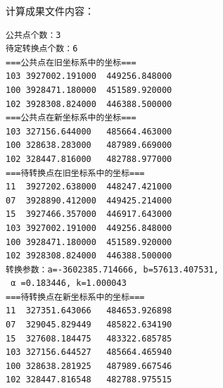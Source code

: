 计算成果文件内容：
\begin{verbatim}
公共点个数：3
待定转换点个数：6
===公共点在旧坐标系中的坐标===
103	3927002.191000	449256.848000
100	3928471.180000	451589.920000
102	3928308.824000	446388.500000
===公共点在新坐标系中的坐标===
103	327156.644000	485664.463000
100	328638.283000	487989.669000
102	328447.816000	482788.977000
===待转换点在旧坐标系中的坐标===
11	3927202.638000	448247.421000
07	3928890.412000	449425.214000
15	3927466.357000	446917.643000
103	3927002.191000	449256.848000
100	3928471.180000	451589.920000
102	3928308.824000	446388.500000
转换参数：a=-3602385.714666, b=57613.407531,
 α =0.183446, k=1.000043
===待转换点在新坐标系中的坐标===
11	327351.643066	484653.926898
07	329045.829449	485822.634190
15	327608.184475	483322.685785
103	327156.644527	485664.465940
100	328638.281925	487989.667546
102	328447.816548	482788.975515
\end{verbatim}
